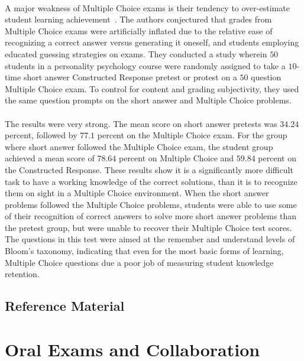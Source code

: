 \documentclass[12pt]{article}
\begin{document}
\paragraph{}
A major weakness of Multiple Choice exams is their tendency to over-estimate student learning achievement~\cite{funk2011multiple}. The authors conjectured that grades from Multiple Choice exams were artificially inflated due to the relative ease of recognizing a correct answer versus generating it oneself, and students employing educated guessing strategies on exams. They conducted a study wherein $50$ students in a personality psychology course were randomly assigned to take a $10$-time short answer Constructed Response pretest or protest on a $50$ question Multiple Choice exam. To control for content and grading subjectivity, they used the same question prompts on the short answer and Multiple Choice problems.
\paragraph{}
The results were very strong. The mean score on short answer pretests was $34.24$ percent, followed by $77.1$ percent on the Multiple Choice exam. For the group where short answer followed the Multiple Choice exam, the student group achieved a mean score of $78.64$ percent on Multiple Choice and $59.84$ percent on the Constructed Response. These results show it is a significantly more difficult task to have a working knowledge of the correct solutions, than it is to recognize them on sight in a Multiple Choice environment. When the short answer problems followed the Multiple Choice problems, students were able to use some of their recognition of correct answers to solve more short answer problems than the pretest group, but were unable to recover their Multiple Choice test scores. The questions in this test were aimed at the remember and understand levels of Bloom's taxonomy, indicating that even for the most basic forms of learning, Multiple Choice questions due a poor job of measuring student knowledge retention.
\subsection{Reference Material}


\section{Oral Exams and Collaboration}\label{sec:communication}
\end{document}
